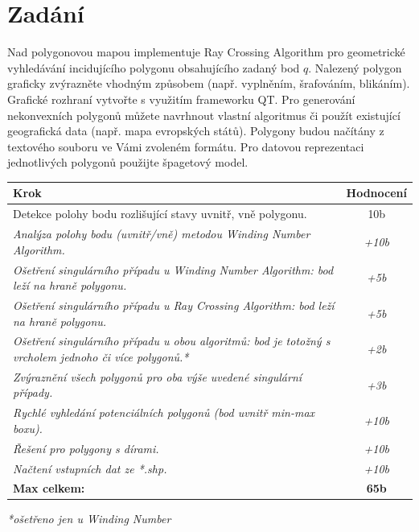 \section{Zadání}
Nad polygonovou mapou implementuje Ray Crossing Algorithm pro geometrické vyhledávání incidujícího polygonu obsahujícího zadaný bod $q$.
\newline
Nalezený polygon graficky zvýrazněte vhodným způsobem (např. vyplněním, šrafováním, blikáním).
Grafické rozhraní vytvořte s využitím frameworku QT. 
\newline
Pro generování nekonvexních polygonů můžete navrhnout vlastní algoritmus či použít existující geografická data (např. mapa evropských států).
\newline
Polygony budou načítány z textového souboru ve Vámi zvoleném formátu.
Pro datovou reprezentaci jednotlivých polygonů použijte špagetový model.


\noindent
\begin{tabularx}{\textwidth}{|X|c|}
    \hline
    \textbf{Krok} & \textbf{Hodnocení} \\
    \hline\hline
    Detekce polohy bodu rozlišující stavy uvnitř, vně polygonu. \cellcolor[HTML]{94F29E}& 10b \\
    \hline
    \textit{Analýza polohy bodu (uvnitř/vně) metodou Winding Number Algorithm.\cellcolor[HTML]{94F29E}} & \textit{+10b} \\
    \hline
    \textit{Ošetření singulárního případu u Winding Number Algorithm: bod leží na hraně polygonu.\cellcolor[HTML]{94F29E}} & \textit{+5b} \\
    \hline
    \textit{Ošetření singulárního případu u Ray Crossing Algorithm: bod leží na hraně polygonu.} & \textit{+5b} \\
    \hline
    \textit{Ošetření singulárního případu u obou algoritmů: bod je totožný s vrcholem jednoho či více polygonů.*\cellcolor[HTML]{FEFF8A}} & \textit{+2b} \\
    \hline
    \textit{Zvýraznění všech polygonů pro oba výše uvedené singulární případy.} & \textit{+3b} \\
    \hline
    \textit{Rychlé vyhledání potenciálních polygonů (bod uvnitř min-max boxu).\cellcolor[HTML]{94F29E}} & \textit{+10b} \\
    \hline
    \textit{Řešení pro polygony s dírami.\cellcolor[HTML]{94F29E}} & \textit{+10b} \\
    \hline
    \textit{Načtení vstupních dat ze *.shp.\cellcolor[HTML]{94F29E}} & \textit{+10b} \\
    \hline
    \textbf{Max celkem:} & \textbf{65b} \\
    \hline
\end{tabularx}

\textit{*ošetřeno jen u Winding Number}
